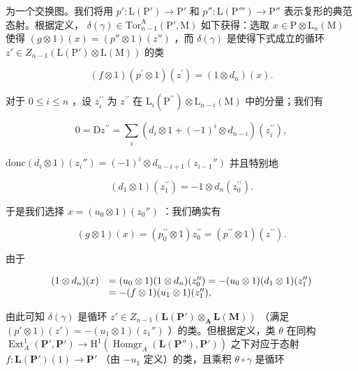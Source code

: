 为一个交换图。我们将用 \(p' : \mathrm{L}(\mathrm{P}') \to \mathrm{P}'\) 和 \(p'' : \mathrm{L}(\mathrm{P}''') \to \mathrm{P}''\) 表示复形的典范态射。根据定义， \(\delta(\gamma) \in \mathrm{Tor}_{n-1}^{\mathrm{A}}(\mathrm{P}', \mathrm{M})\) 如下获得：选取 \(x \in \mathrm{P} \otimes \mathrm{L}_n(\mathrm{M})\) 使得 \((g \otimes 1)(x) = (p'' \otimes 1)(z'')\) ，而 \(\delta(\gamma)\) 是使得下式成立的循环 \(z' \in Z_{n-1}(\mathrm{L}(\mathrm{P}') \otimes \mathrm{L}(\mathrm{M}))\) 的类

\[
(f \otimes 1) (p ^ {\prime} \otimes 1) (z ^ {\prime}) = (1 \otimes d _ {n}) (x).
\]

对于 \(0 \leqslant i \leqslant n\) ，设 \(z_{i}^{\prime \prime}\) 为 \(z^{\prime \prime}\) 在 \(\mathrm{L}_{i}(\mathrm{P}^{\prime \prime}) \otimes \mathrm{L}_{n - i}(\mathrm{M})\) 中的分量；我们有

\[
0 = \mathrm{D} z ^ {\prime \prime} = \sum_ {i} \left(d _ {i} \otimes 1 + (- 1) ^ {i} \otimes d _ {n - i}\right) (z _ {i} ^ {\prime \prime}),
\]

\(\mathrm{donc}(d_i \otimes 1)(z_i'') = (-1)^i \otimes d_{n-i+1}(z_{i-1}'')\) 并且特别地

\[
\left(d _ {1} \otimes 1\right) \left(z _ {1} ^ {\prime \prime}\right) = - 1 \otimes d _ {n} \left(z _ {0} ^ {\prime \prime}\right).
\]

于是我们选择 \(x = (u_0 \otimes 1)(z_0'')\) ：我们确实有

\[
(g \otimes 1) (x) = \left(p _ {0} ^ {\prime \prime} \otimes 1\right) z _ {0} ^ {\prime \prime} = \left(p ^ {\prime \prime} \otimes 1\right) \left(z ^ {\prime \prime}\right).
\]

由于

\[
\begin{array}{r l} (1 \otimes d _ {n}) (x) & = (u _ {0} \otimes 1) (1 \otimes d _ {n}) (z _ {0} ^ {\prime \prime}) = - (u _ {0} \otimes 1) (d _ {1} \otimes 1) (z _ {1} ^ {\prime \prime}) \\ & = - (f \otimes 1) (u _ {1} \otimes 1) (z _ {1} ^ {\prime \prime}), \end{array}
\]

由此可知 \(\delta(\gamma)\) 是循环 \(z' \in Z_{n-1}(\mathbf{L}(\mathbf{P}') \otimes_{\mathbf{A}} \mathbf{L}(\mathbf{M}))\) （满足 \((p' \otimes 1)(z') = -(u_1 \otimes 1)(z_1'')\) ）的类。但根据定义，类 \(\theta\) 在同构 \(\operatorname{Ext}_A^1(\mathbf{P}', \mathbf{P}') \to \mathrm{H}^1(\operatorname{Homgr}_A(\mathbf{L}(\mathbf{P}''), \mathbf{P'}))\) 之下对应于态射 \(f: \mathbf{L}(\mathbf{P}') (1) \to \mathbf{P}'\) （由 \(-u_1\) 定义）的类，且乘积 \(\theta \circ \gamma\) 是循环

